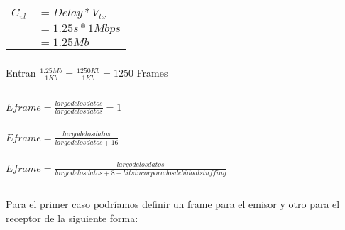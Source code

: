 \section{}

\subsection{}

\subsubsection{}
\begin{tabular}{rl}
$C_{vl}$ & $= Delay * V_{tx}$ \\
& $= 1.25s * 1Mbps$ \\
& $= 1.25Mb$ \\
\end{tabular}

\subsubsection{}
Entran $\frac{1.25Mb}{1Kb} = \frac{1250Kb}{1Kb} = 1250$ Frames

\subsection{}

\subsubsection{}
$Eframe = \frac{largo de los datos}{largo de los datos} = 1$

\subsubsection{}
$Eframe = \frac{largo de los datos}{largo de los datos + 16}$

\subsubsection{}
$Eframe = \frac{largo de los datos}{largo de los datos + 8 + bits incorporados debido al stuffing}$

\subsection{}

\subsubsection{}
Para el primer caso podríamos definir un frame para el emisor y otro para el receptor de la siguiente forma:

